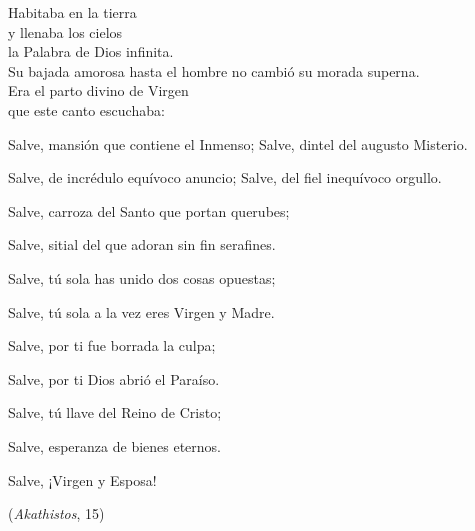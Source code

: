 \begin{patercite}
	Habitaba en la tierra \\y llenaba los cielos \\la Palabra de Dios infinita. \\Su bajada amorosa hasta el hombre no cambió su morada superna. \\Era el parto divino de Virgen\\ que este canto escuchaba:
	
	Salve, mansión que contiene el Inmenso; Salve, dintel del augusto Misterio.
	
	Salve, de incrédulo equívoco anuncio; Salve, del fiel inequívoco orgullo.
	
	Salve, carroza del Santo que portan querubes;
	
	Salve, sitial del que adoran sin fin serafines.
	
	Salve, tú sola has unido dos cosas opuestas;
	
	Salve, tú sola a la vez eres Virgen y Madre.
	
	Salve, por ti fue borrada la culpa;
	
	Salve, por ti Dios abrió el Paraíso.
	
	Salve, tú llave del Reino de Cristo;
	
	Salve, esperanza de bienes eternos.
	
	Salve, ¡Virgen y Esposa!
	
	(\emph{Akathistos}, 15)\cite{Akathistos_015}
\end{patercite}